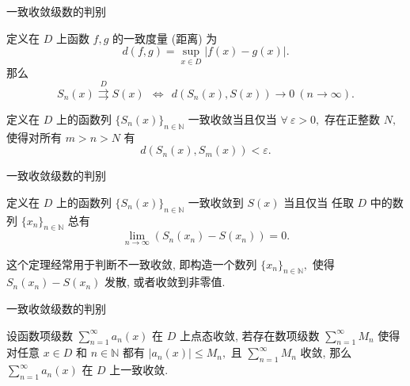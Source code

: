 
\begin{frame}{一致收敛级数的判别}

\begin{thm}[一致度量判别法]
定义在 $D$ 上函数 $f,g$ 的一致度量 (距离) 为
\vspace{-0.5em}
\[d(f, g) = \sup\limits_{x \in D} \lvert f(x) - g(x) \rvert.\]
\vspace{-0.5em}
那么
\vspace{-0.5em}
\[S_n(x) \stackrel{D}{\rightrightarrows} S(x) ~~ \Longleftrightarrow ~~ d(S_n(x), S(x)) \to 0 ~ (n \to \infty).\]
\end{thm}

\pause

\begin{thm}
定义在 $D$ 上的函数列 $\{S_n(x)\}_{n\in\mathbb{N}}$ 一致收敛当且仅当 $\forall~\varepsilon > 0,$ 存在正整数 $N,$ 使得对所有 $m > n > N$ 有
\[d(S_n(x), S_m(x)) < \varepsilon.\]
\end{thm}

\end{frame}


\begin{frame}{一致收敛级数的判别}

\begin{thm}[数列判别法]
定义在 $D$ 上的函数列 $\{S_n(x)\}_{n\in\mathbb{N}}$ 一致收敛到 $S(x)$ 当且仅当 任取 $D$ 中的数列 $\{x_n\}_{n\in\mathbb{N}}$ 总有
\[\lim\limits_{n\to\infty} (S_n(x_n) - S(x_n)) = 0.\]
\end{thm}

\pause
\vspace{1em}

这个定理经常用于判断不一致收敛, 即构造一个数列 $\{x_n\}_{n\in\mathbb{N}},$ 使得 $S_n(x_n) - S(x_n)$ 发散, 或者收敛到非零值.

\end{frame}


\begin{frame}{一致收敛级数的判别}

\begin{thm}
设函数项级数 $\sum\limits_{n=1}^\infty a_n(x)$ 在 $D$ 上点态收敛, 若存在数项级数 $\sum\limits_{n=1}^\infty M_n$ 使得对任意 $x \in D$ 和 $n \in \mathbb{N}$ 都有 $\lvert a_n(x) \rvert \leqslant M_n,$ 且 $\sum\limits_{n=1}^\infty M_n$ 收敛, 那么 $\sum\limits_{n=1}^\infty a_n(x)$ 在 $D$ 上一致收敛.
\end{thm}

\end{frame}

